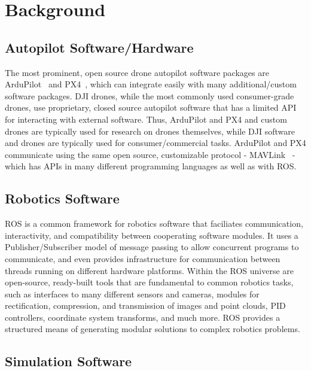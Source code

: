 \section{Background}

\subsection{Autopilot Software/Hardware}

The most prominent, open source drone autopilot software packages are ArduPilot~\cite{ardupilot_website} and PX4~\cite{pixhawk_website},
which can integrate easily with many additional/custom software packages.
DJI drones, while the most commonly used consumer-grade drones, use proprietary, closed source autopilot software
that has a limited API for interacting with external software.
Thus, ArduPilot and PX4 and custom drones are typically used for research on drones themselves,
while DJI software and drones are typically used for consumer/commercial tasks.
ArduPilot and PX4 communicate using the same open source, customizable protocol - MAVLink~\cite{mavlink_io} -
which has APIs in many different programming languages as well as with ROS.

\subsection{Robotics Software}

ROS is a common framework for robotics software that faciliates communication, interactivity, and compatibility
between cooperating software modules.
It uses a Publisher/Subscriber model of message passing to allow concurrent programs to communicate,
and even provides infrastructure for communication between threads running on different hardware platforms.
Within the ROS universe are open-source, ready-built tools that are fundamental to common robotics tasks,
such as interfaces to many different sensors and cameras,
modules for rectification, compression, and transmission of images and point clouds,
PID controllers,
coordinate system transforms,
and much more.
ROS provides a structured means of generating modular solutions to complex robotics problems.

\subsection{Simulation Software}

